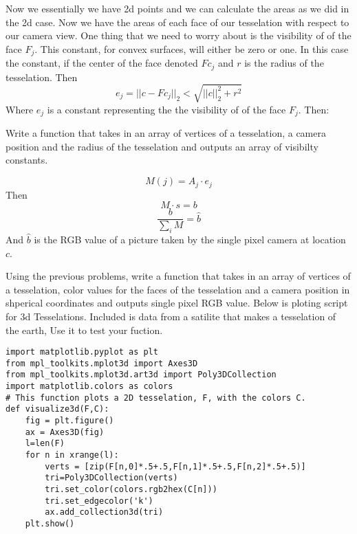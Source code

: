 Now we essentially we have 2d points and we can calculate the areas as we did in the 2d case. Now we have the areas of each face of our tesselation with respect to our camera view. One thing that we need to worry about is the visibility of of the face $F_j$. This constant, for convex surfaces, will either be zero or one. In this case the constant, if the center of the face denoted $Fc_j$ and $r$ is the radius of the tesselation. Then
\[
e_j=||c-Fc_j||_2<\sqrt{||c||_2^2+r^2}
\] 
Where $e_j$ is a constant representing the  the visibility of of the face $F_j$. Then:

\begin{problem}
Write a function that takes in an array of vertices of a tesselation, a camera position and the radius of the tesselation and outputs an array of visibilty constants.
\end{problem}
\begin{equation}
M(j) = A_j \cdot e_j
\end{equation}
Then
\begin{equation}
M \cdot s = b
\end{equation}
\begin{equation}
\frac{b}{\sum_i M} = \hat{b}
\end{equation}
And $\hat{b}$ is the RGB value of a picture taken by the single pixel camera at location $c$.

\begin{problem}
Using the previous problems, write a function that takes in an array of vertices of a tesselation, color values for the faces of the tesselation and a camera position in shperical coordinates and outputs single pixel RGB value. Below is ploting script for 3d Tesselations. Included is data from a satilite that makes a tesselation of the earth, Use it to test your fuction.
\end{problem}

\begin{lstlisting}
import matplotlib.pyplot as plt
from mpl_toolkits.mplot3d import Axes3D
from mpl_toolkits.mplot3d.art3d import Poly3DCollection
import matplotlib.colors as colors
# This function plots a 2D tesselation, F, with the colors C. 
def visualize3d(F,C):
    fig = plt.figure()
    ax = Axes3D(fig)
    l=len(F)
    for n in xrange(l):
        verts = [zip(F[n,0]*.5+.5,F[n,1]*.5+.5,F[n,2]*.5+.5)]
        tri=Poly3DCollection(verts)
        tri.set_color(colors.rgb2hex(C[n]))
        tri.set_edgecolor('k')
        ax.add_collection3d(tri)
    plt.show()
\end{lstlisting}


